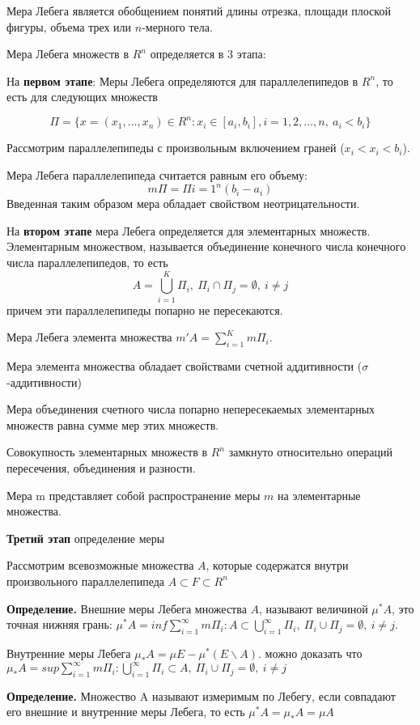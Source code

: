 \documentclass[14pt,a4paper]{extarticle}
\theoremstyle{definition}
\theoremstyle{remark}
\newcommand{\sep}{ , \ \allowbreak }
\renewcommand{\[}{\begin{dmath*}[compact]}
\renewcommand{\]}{\end{dmath*}}
\newcommand{\tdef}{\textbf{Определение.} }
\begin{document}
Мера Лебега является обобщением понятий длины отрезка, площади плоской фигуры, объема трех или $n$-мерного тела.

Мера Лебега множеств в $R^n$ определяется в 3 этапа:

На \textbf{первом этапе}: Меры Лебега определяются для параллелепипедов в $R^n$, то есть для следующих множеств

\[
  \Pi = \{x=(x_1,\dots,x_n)\in R^n: x_i\in [a_i,b_i], i=1,2,\dots,n\sep a_i<b_i\}
\]

Рассмотрим параллелепипеды с произвольным включением граней ($x_i<x_i<b_i$).

Мера Лебега параллелепипеда считается равным его объему:
\[m\Pi = \Pi{i=1}^n(b_i-a_i)\]
Введенная таким образом мера обладает свойством неотрицательности.

На \textbf{втором этапе} мера Лебега определяется для элементарных множеств. Элементарным множеством, называется объединение конечного числа конечного числа параллелепипедов, то есть
\[A=\bigcup _{i=1}^K \Pi_i\sep\Pi_i \cap \Pi_j = \emptyset \sep i\neq j\]
причем эти параллелепипеды попарно не пересекаются.

Мера Лебега элемента множества $m'A=\sum_{i=1}^Km\Pi_i$.

Мера элемента множества обладает свойствами счетной аддитивности ($\sigma$-аддитивности)

Мера объединения счетного числа попарно непересекаемых элементарных множеств равна сумме мер этих множеств.

Совокупность элементарных множеств в $R^n$ замкнуто относительно операций пересечения, объединения и разности.

Мера m представляет собой распространение меры $m$ на элементарные множества.

\textbf{Третий этап} определение меры

Рассмотрим всевозможные множества $A$, которые содержатся внутри произвольного параллелепипеда $A\subset F \subset R^n$

\tdef Внешние меры Лебега множества $A$, называют величиной $\mu^*A$, это точная нижняя грань: $\mu^*A=inf\sum_{i=1}^\infty m\Pi_i: A\subset\bigcup _{i=1}^\infty\Pi_i\sep \Pi_i\cup\Pi_j=\emptyset\sep i\neq j$.

Внутренние меры Лебега $\mu_*A=\mu E-\mu^*(E\backslash A)$. можно доказать что $\mu_*A=sup\sum_{i=1}^\infty m\Pi_i: \bigcup _{i=1}^\infty\Pi_i \subset A\sep \Pi_i\cup\Pi_j=\emptyset\sep i\neq j$

\tdef Множество A называют измеримым по Лебегу, если совпадают его внешние и внутренние меры Лебега, то есть $\mu^*A=\mu_*A=\mu A$
\end{document}
